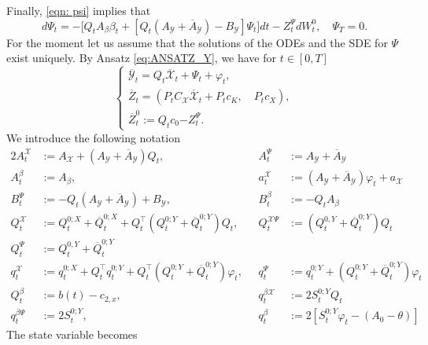 \documentclass[11pt,twoside]{amsart}
\theoremstyle{definition}
\numberwithin{equation}{section}
\renewcommand{\bar}{\overline}
\begin{document}
Finally, \eqref{eqn: psi}  implies that 
\begin{equation}
    d\Psi_t = - \bigg[Q_t A_\beta \beta_t + [Q_t (A_{\mathcal{Y}}+ \overline{A}_{\mathcal{Y}})- B_{\mathcal{Y}}] \Psi_t\bigg] dt - Z^\Psi_t dW^0_t, \quad {\Psi_T = 0}.
\end{equation}
For the moment let us assume that the solutions of the ODEs and the SDE for $\Psi$ exist uniquely. By Ansatz \eqref{eq:ANSATZ_Y}, we have for $t\in[0,T]$ 
\begin{equation*}
    \begin{cases}
        \bar{\mathcal{Y}}_t = Q_t \bar{\mathcal{X}}_t + \Psi_t + \varphi_t,\\
        \bar{Z}_t = ( P_t C_{\mathcal{X}} \bar{\mathcal{X}}_t + P_t c_K,\quad P_t c_X),\\
        \bar{Z}^0_t := Q_t c_0 {- Z^\Psi_t }.
    \end{cases}
\end{equation*}
We introduce the following notation
\begin{alignat*}{2}
    A^\mathcal{X}_t        &:= A_\mathcal{X} + (A_\mathcal{Y} + \bar{A}_\mathcal{Y})Q_t, \quad & 
    A^\Psi_t               &:= A_\mathcal{Y} + \bar{A}_\mathcal{Y} \\[3pt]
    A^\beta_t              &:= A_\beta, & 
    a^\mathcal{X}_t        &:= (A_\mathcal{Y} + \bar{A}_\mathcal{Y}) \varphi_t + a_\mathcal{X} \\[8pt]
    B^\Psi_t               &:= -Q_t(A_\mathcal{Y} + \bar{A}_\mathcal{Y}) + B_\mathcal{Y}, & 
    B^\beta_t              &:= -Q_tA_\beta \\[8pt]
    Q^\mathcal{X}_t        &:= Q^{0;X}_t + \bar{Q}^{0;X}_t + Q^\top_t(Q^{0;Y}_t + \bar{Q}^{0;Y}_t)Q_t,\quad & 
    Q^{\mathcal{X}\Psi}_t  &:= (Q^{0,Y}_t + \bar{Q}^{0;Y}_t) Q_t \\[3pt]
    Q^\Psi_t               &:= Q^{0,Y}_t + \bar{Q}^{0;Y}_t && \\[8pt]
    q^\mathcal{X}_t        &:= q^{0;X}_t + Q^\top_t q^{0;Y}_t + Q^\top_t (Q^{0;Y}_t + \bar{Q}^{0;Y}_t)\varphi_t, & 
    q^\Psi_t               &:= q^{0;Y}_t + (Q^{0;Y}_t + \bar{Q}^{0;Y}_t)\varphi_t \\[8pt]
    Q^\beta_t              &:= b(t) - c_{2,x}, & 
    q^{\beta\mathcal{X}}_t &:= 2S^{0;Y}_t Q_t \\[3pt]
    q^{\beta\Psi}_t        &:= 2S^{0;Y}_t, & 
    q^\beta_t              &:= 2[S^{0;Y}_t \varphi_t - (A_0 - \theta)]
\end{alignat*}
The state variable becomes
\end{document}
